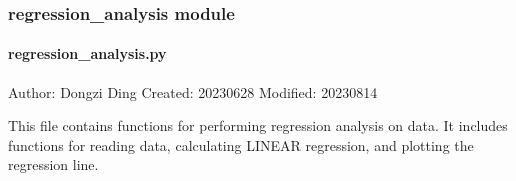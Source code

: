\documentclass[a4paper,10pt,english]{sphinxmanual}
\begin{document}
\subsubsection{regression\_analysis module}
\label{\detokenize{utils:module-src.utils.regression_analysis}}\label{\detokenize{utils:regression-analysis-module}}

\paragraph{regression\_analysis.py}
\label{\detokenize{utils:regression-analysis-py}}
\sphinxAtStartPar
Author: Dongzi Ding
Created: 2023\sphinxhyphen{}06\sphinxhyphen{}28
Modified: 2023\sphinxhyphen{}08\sphinxhyphen{}14

\sphinxAtStartPar
This file contains functions for performing regression analysis on data. 
It includes functions for reading data, calculating LINEAR regression,
and plotting the regression line.
\end{document}
